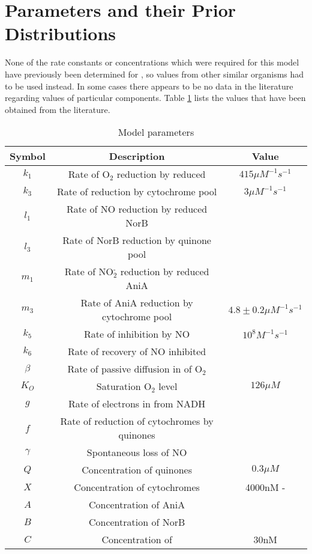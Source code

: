 
\section{Parameters and their Prior Distributions}

None of the rate constants or concentrations which were required for this model have previously been determined for \Nsm, so values from other similar organisms had to be used instead. In some cases there appears to be no data in the literature regarding values of particular components. Table \ref{tab:ps} lists the values that have been obtained from the literature.

\begin{table}[ht!]
\begin{center}
\begin{tabular}{ccc}
\toprule
\textbf{Symbol} & \textbf{Description} & \textbf{Value}\\
\midrule
$k_1$ & Rate of O$_{\textrm{2}}$ reduction by reduced \cbbthree{} & $415\mu M^{-1} s^{-1}$ \\
$k_3$ & Rate of \cbbthree{} reduction by cytochrome pool & $3\mu M^{-1} s^{-1}$\\ 
$l_1$ & Rate of NO reduction by reduced NorB\\
$l_3$ & Rate of NorB reduction by quinone pool\\
$m_1$ & Rate of NO$_{\textrm{2}}^{\textrm{-}}$ reduction by reduced AniA\\
$m_3$ & Rate of AniA reduction by cytochrome pool & $4.8\pm0.2 \mu M^{-1}s^{-1}$\\
$k_5$ & Rate of \cbbthree{} inhibition by NO & $10^8 M ^{-1} s ^{-1}$\\
$k_6$ & Rate of recovery of NO inhibited \cbbthree{}\\
$\beta$ & Rate of passive diffusion in of O$_{\textrm{2}}$\\
$K_O$ & Saturation O$_{\textrm{2}}$ level & $126\mu M$\\
$g$ & Rate of electrons in from NADH\\
$f$ & Rate of reduction of cytochromes by quinones\\
$\gamma$ & Spontaneous loss of NO\\
$Q$ & Concentration of quinones & $0.3\mu M$\\
$X$ & Concentration of cytochromes & 4000nM - \cbbthree{}\\   
$A$ & Concentration of AniA\\
$B$ & Concentration of NorB\\
$C$ & Concentration of \cbbthree{} & 30nM \\
\bottomrule
\end{tabular}
\caption{Model parameters
\label{tab:ps}}
\end{center}
\end{table}

